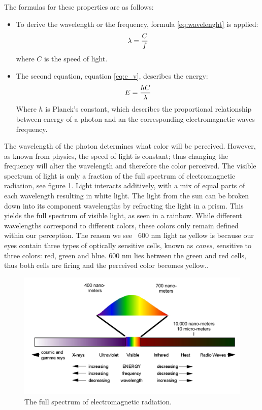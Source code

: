 The formulas for these properties are as follows:
\begin{itemize}
\item To derive the wavelength or the frequency, formula \ref{eq:wavelenght} is applied:
\begin{align}
\centering 
\lambda = \frac{C}{f}
\label{eq:wavelenght} 
\end{align}
where {$C$} is the speed of light.
\item The second equation, equation \ref{eq:e_v}, describes the energy:
\begin{align}
\centering
E = \frac{hC}{\lambda}
\label{eq:e_v} 
\end{align}
Where {$h$} is Planck's constant, which describes the proportional relationship between energy of a photon and an the corresponding electromagnetic waves frequency.
\end{itemize}

The wavelength of the photon determines what color will be perceived. However, as known from physics, the speed of light is constant; thus changing the frequency will alter the wavelength and therefore the color perceived. The visible spectrum of light is only a fraction of the full spectrum of electromagnetic radiation, see figure \ref{fig:em_rad}. Light interacts additively, with a mix of equal parts of each wavelength resulting in white light. The light from the sun can be broken down into its component wavelengths by refracting the light in a prism. This yields the full spectrum of visible light, as seen in a rainbow.
While different wavelengths correspond to different colors, these colors only remain defined within our perception. The reason we see ~600 nm light as yellow is because our eyes contain three types of optically sensitive cells, known as \textit{cones}, sensitive to three colors: red, green and blue. 600 nm lies between the green and red cells, thus both cells are firing and the perceived color becomes yellow.\citep{perception_book}.

\begin{figure}[htbp] 
\centering 
\includegraphics[width=1\textwidth]{Pictures/Theory/em_rad.png} 
\caption{The full spectrum of electromagnetic radiation.} 
\label{fig:em_rad} 
\end{figure}

